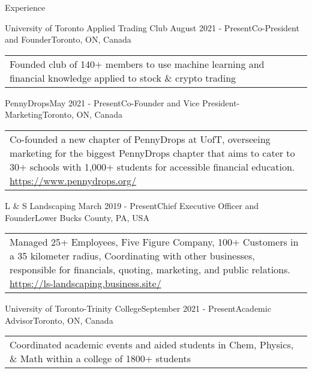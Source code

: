 \documentclass[UTF8]{resume} %
\begin{document}
\begin{rSection}{Experience}
\begin{rSubsection}{University of Toronto Applied Trading Club }{August 2021 - Present}{Co-President and Founder}{Toronto, ON, Canada}
    \begin{tabular}{p{15cm}}
        \scriptsize{Founded club of 140\(+\) members to use machine learning and financial knowledge applied to stock \& crypto trading}
    \end{tabular}
\end{rSubsection}
\begin{rSubsection}{PennyDrops}{May 2021 - Present}{Co-Founder and Vice President-Marketing}{Toronto, ON, Canada}
    \begin{tabular}{p{15cm}}
        \scriptsize{Co-founded a new chapter of PennyDrops at UofT, overseeing marketing for the biggest PennyDrops chapter that aims to cater to 30\(+\) schools with 1,000\(+\) students for accessible financial education. \href{https://www.pennydrops.org/}{https://www.pennydrops.org/}}
    \end{tabular}
\end{rSubsection}
\begin{rSubsection}{L \& S Landscaping }{March 2019 - Present}{Chief Executive Officer and Founder}{Lower Bucks County, PA, USA}
    \begin{tabular}{p{15cm}}
        \scriptsize{Managed 25+ Employees, Five Figure Company, 100\(+\) Customers in a 35 kilometer radius, Coordinating with other businesses, responsible for financials, quoting, marketing, and public relations. \href{https://ls-landscaping.business.site/}{https://ls-landscaping.business.site/}}
    \end{tabular}
\end{rSubsection}
\begin{rSubsection}{University of Toronto-Trinity College}{September 2021 - Present}{Academic Advisor}{Toronto, ON, Canada}
    \begin{tabular}{p{15cm}}
        \scriptsize{Coordinated academic events and aided students in Chem, Physics, \& Math within a college of 1800+ students}
    \end{tabular}
\end{rSubsection}
\end{rSection}


\end{document}
